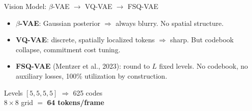 \documentclass[aspectratio=169]{beamer}
\newcommand{\spatialres}{8}          %
\newcommand{\ntokens}{64}            %
\newcommand{\fsqcodes}{625}          %
\begin{document}
\begin{frame}{Vision Model: $\beta$-VAE $\to$ VQ-VAE $\to$ FSQ-VAE}
  \begin{itemize}
    \item \textbf{$\beta$-VAE}: Gaussian posterior $\Rightarrow$ always blurry. No spatial structure.
    \item \textbf{VQ-VAE}: discrete, spatially localized tokens $\Rightarrow$ sharp. But codebook collapse, commitment cost tuning.
    \item \textbf{FSQ-VAE} (Mentzer et al., 2023): round to $L$ fixed levels. No codebook, no auxiliary losses, 100\% utilization by construction.
  \end{itemize}

  \vspace{0.3em}
  \begin{center}
    Levels $[5,5,5,5]$ $\Rightarrow$ \fsqcodes{} codes\\
    $\spatialres\times\spatialres$ grid $=$ \textbf{\ntokens{} tokens/frame}
  \end{center}
\end{frame}
\end{document}
